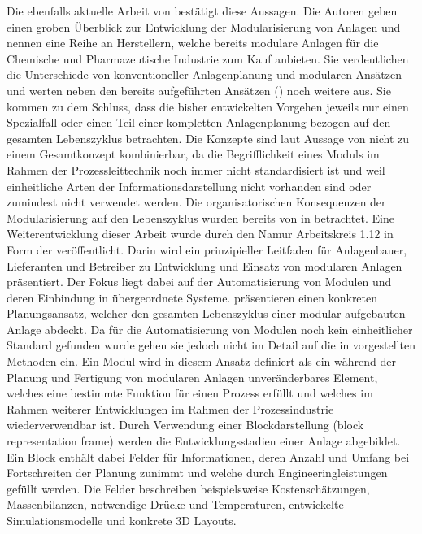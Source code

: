 Die ebenfalls aktuelle Arbeit  von \citeauthor{Hohmann_2017} \cite{Hohmann_2017} best\"atigt diese Aussagen. Die Autoren geben einen groben \"Uberblick zur Entwicklung der Modularisierung von Anlagen und nennen eine Reihe an Herstellern, welche bereits modulare Anlagen f\"ur die Chemische und Pharmazeutische Industrie  zum Kauf anbieten. \newline
Sie verdeutlichen die Unterschiede von konventioneller Anlagenplanung und modularen Ans\"atzen und werten neben den bereits aufgef\"uhrten Ans\"atzen (\cite{Bramsiepe_2012, Uzuner_2012, Hady_2012,Fleischer_2016}) noch weitere aus. Sie kommen zu dem Schluss, dass die bisher entwickelten Vorgehen jeweils nur einen Spezialfall oder einen Teil einer kompletten Anlagenplanung bezogen auf den gesamten Lebenszyklus betrachten. Die Konzepte sind laut Aussage von \citeauthor{Hohmann_2017} nicht zu einem Gesamtkonzept kombinierbar, da die Begrifflichkeit eines Moduls im Rahmen der Prozessleittechnik noch immer nicht standardisiert ist und weil einheitliche Arten der Informationsdarstellung nicht vorhanden sind oder zumindest nicht verwendet werden. \newline
Die organisatorischen Konsequenzen der Modularisierung auf den Lebenszyklus wurden bereits von \citeauthor{Obst_2013b} in \cite{Obst_2013b} betrachtet. Eine Weiterentwicklung dieser Arbeit wurde durch den Namur Arbeitskreis 1.12 in Form der  \cite{ne_148} ver\"offentlicht. Darin wird ein prinzipieller Leitfaden f\"ur Anlagenbauer, Lieferanten und Betreiber zu Entwicklung und Einsatz von modularen Anlagen pr\"asentiert. Der Fokus liegt dabei auf der Automatisierung von Modulen und deren Einbindung in \"ubergeordnete Systeme. \newline
\citeauthor{Hohmann_2017} pr\"asentieren einen konkreten Planungsansatz, welcher den gesamten Lebenszyklus einer modular aufgebauten Anlage abdeckt. Da f\"ur die Automatisierung von Modulen noch kein einheitlicher Standard gefunden wurde gehen sie jedoch nicht im Detail auf die in \cite{ne_148} vorgestellten Methoden ein. \newline
Ein Modul wird in diesem Ansatz definiert als \glqq ein w\"ahrend der Planung und Fertigung von modularen Anlagen unver\"anderbares Element, welches eine bestimmte Funktion f\"ur einen Prozess erf\"ullt und welches im Rahmen weiterer Entwicklungen im Rahmen der Prozessindustrie wiederverwendbar ist\grqq { }\cite[S. 2]{Hohmann_2017}. Durch Verwendung einer Blockdarstellung (\glqq block representation frame\grqq { }) werden die Entwicklungsstadien einer Anlage abgebildet. Ein Block enth\"alt dabei Felder f\"ur Informationen, deren Anzahl und Umfang bei Fortschreiten der Planung zunimmt und welche durch Engineeringleistungen gef\"ullt werden. Die Felder beschreiben beispielsweise Kostensch\"atzungen, Massenbilanzen, notwendige Dr\"ucke und Temperaturen, entwickelte Simulationsmodelle und konkrete 3D Layouts.

